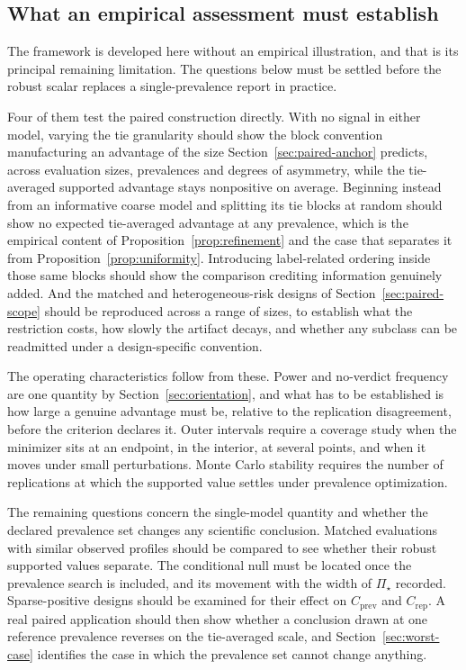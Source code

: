 \documentclass[11pt]{article}
\newcommand{\PSet}{\Pi_\star}
\theoremstyle{remark}
\begin{document}
\subsection{What an empirical assessment must establish}

The framework is developed here without an empirical illustration, and that is its principal remaining limitation. The questions below must be settled before the robust scalar replaces a single-prevalence report in practice.

Four of them test the paired construction directly. With no signal in either model, varying the tie granularity should show the block convention manufacturing an advantage of the size Section~\ref{sec:paired-anchor} predicts, across evaluation sizes, prevalences and degrees of asymmetry, while the tie-averaged supported advantage stays nonpositive on average. Beginning instead from an informative coarse model and splitting its tie blocks at random should show no expected tie-averaged advantage at any prevalence, which is the empirical content of Proposition~\ref{prop:refinement} and the case that separates it from Proposition~\ref{prop:uniformity}. Introducing label-related ordering inside those same blocks should show the comparison crediting information genuinely added. And the matched and heterogeneous-risk designs of Section~\ref{sec:paired-scope} should be reproduced across a range of sizes, to establish what the restriction costs, how slowly the artifact decays, and whether any subclass can be readmitted under a design-specific convention.

The operating characteristics follow from these. Power and no-verdict frequency are one quantity by Section~\ref{sec:orientation}, and what has to be established is how large a genuine advantage must be, relative to the replication disagreement, before the criterion declares it. Outer intervals require a coverage study when the minimizer sits at an endpoint, in the interior, at several points, and when it moves under small perturbations. Monte Carlo stability requires the number of replications at which the supported value settles under prevalence optimization.

The remaining questions concern the single-model quantity and whether the declared prevalence set changes any scientific conclusion. Matched evaluations with similar observed profiles should be compared to see whether their robust supported values separate. The conditional null must be located once the prevalence search is included, and its movement with the width of $\PSet$ recorded. Sparse-positive designs should be examined for their effect on $C_{\mathrm{prev}}$ and $C_{\mathrm{rep}}$. A real paired application should then show whether a conclusion drawn at one reference prevalence reverses on the tie-averaged scale, and Section~\ref{sec:worst-case} identifies the case in which the prevalence set cannot change anything.
\end{document}
